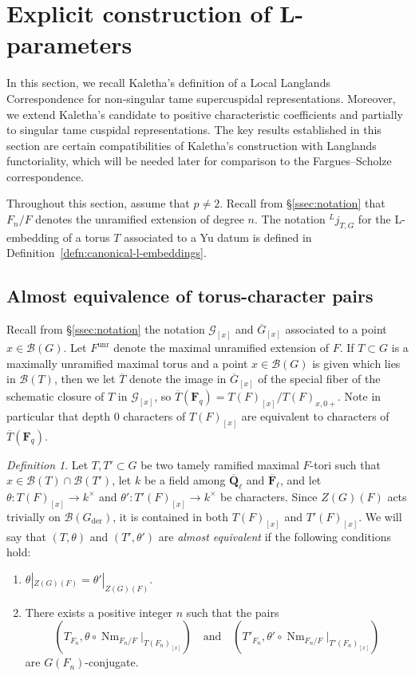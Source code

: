 \documentclass[reqno]{amsart}
\numberwithin{equation}{subsection}
\newcommand{\F}{\mathbf{F}}
\newcommand{\Q}{\mathbf{Q}}
\newcommand{\ol}[1]{\overline{#1}}
\newcommand{\co}{\colon}
\newcommand{\ld}{{}^L}
\newcommand\cB{\mathcal{B}}
\newcommand\cG{\mathcal{G}}
\DeclareMathOperator{\Nm}{Nm}
\DeclareMathOperator{\unr}{unr}
\DeclareMathOperator{\der}{der}
\theoremstyle{remark}
\newtheorem{defn}[thm]{Definition}
\numberwithin{equation}{subsection}
\numberwithin{figure}{subsection}
\begin{document}
\section{Explicit construction of L-parameters}\label{sec:kaletha-param}

In this section, we recall Kaletha's definition of a Local Langlands Correspondence for non-singular tame supercuspidal representations. Moreover, we extend Kaletha's candidate to positive characteristic coefficients and partially to singular tame cuspidal representations. The key results established in this section are certain compatibilities of Kaletha's construction with Langlands functoriality, which will be needed later for comparison to the Fargues--Scholze correspondence.

Throughout this section, assume that $p\neq 2$. Recall from \S\ref{ssec:notation} that $F_n/F$ denotes the unramified extension of degree $n$. The notation $\ld j_{T,G}$ for the L-embedding of a torus $T$ associated to a Yu datum is defined in Definition~\ref{defn:canonical-l-embeddings}.


\subsection{Almost equivalence of torus-character pairs}\label{ss:inertial-equiv}

Recall from \S\ref{ssec:notation} the notation $\cG_{[x]}$ and $\ol G_{[x]}$ associated to a point $x \in \cB(G)$. Let $F^{\unr}$ denote the maximal unramified extension of $F$. If $T \subset G$ is a maximally unramified maximal torus and a point $x \in \cB(G)$ is given which lies in $\cB(T)$, then we let $\ol T$ denote the image in $\ol G_{[x]}$ of the special fiber of the schematic closure of $T$ in $\cG_{[x]}$, so $\ol T(\F_q) = T(F)_{[x]}/T(F)_{x,0+}$. Note in particular that depth $0$ characters of $T(F)_{[x]}$ are equivalent to characters of $\ol T(\F_q)$.

\begin{defn}\label{defn:almost-equivalent}
Let $T, T' \subset G$ be two tamely ramified maximal $F$-tori such that $x \in \cB(T) \cap \cB(T')$, let $k$ be a field among $\ol\Q_\ell$ and $\ol\F_\ell$, and let $\theta\co T(F)_{[x]} \to k^\times$ and $\theta'\co T'(F)_{[x]} \to k^\times$ be characters. Since $Z(G)(F)$ acts trivially on $\cB(G_{\der})$, it is contained in both $T(F)_{[x]}$ and $T'(F)_{[x]}$. We will say that $(T,\theta)$ and $(T',\theta')$ are \textit{almost equivalent} if the following conditions hold:
\begin{enumerate}
    \item $\theta|_{Z(G)(F)} = \theta'|_{Z(G)(F)}$.
    \item There exists a positive integer $n$ such that the pairs
    \[
        \left(T_{F_n},\theta\circ \Nm_{F_n/F}|_{T(F_n)_{[x]}}\right)
        \quad\text{and}\quad
        \left(T'_{F_n},\theta'\circ \Nm_{F_n/F}|_{T'(F_n)_{[x]}}\right)
    \]
    are $G(F_n)$-conjugate.
\end{enumerate}
\end{defn}
\end{document}
